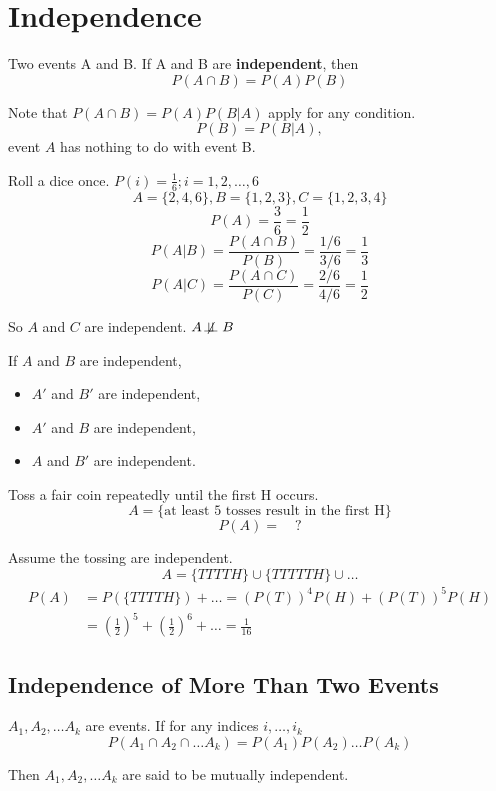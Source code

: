 \section{Independence}
\begin{defn}
Two events A and B. If A and B are \textbf{independent}, then
\[P(A\cap B)=P(A)P(B) \]

Note that $P(A \cap B)=P(A)P(B|A)$ apply for any condition.
\[  P(B)=P(B|A), \]
event $A$ has nothing to do with event B.
\end{defn}

\begin{exmp}
  Roll a dice once. $P(i)=\frac{1}{6}; i=1,2,\dots,6$
  \[  A=\{2,4,6\},   B=\{1,2,3\},   C=\{1,2,3,4\} \]
  \[  P(A)=\frac{3}{6}=\frac{1}{2} \]
  \[ P(A|B)=\frac{P(A\cap B)}{P(B)}=\frac{1/6}{3/6}=\frac{1}{3} \]
  \[ P(A|C)=\frac{P(A\cap C)}{P(C)}=\frac{2/6}{4/6}=\frac{1}{2} \]

So $A$ and $C$ are independent. $A \not\!\perp\!\!\!\perp B$
\end{exmp}

\begin{prop}
If $A$ and $B$ are independent,
\begin{itemize}
  \item $A'$ and $B'$ are independent,
  \item $A'$ and $B$ are independent,
  \item $A$ and $B'$ are independent.
\end{itemize}
\end{prop}

\begin{exmp}
  Toss a fair coin repeatedly until the first H occurs.
  \[A=\{\text{at least 5 tosses result in the first H}\}\]
  \[P(A)= \quad ?\]
\begin{solution}	 
Assume the tossing are independent.
\[A=\{TTTTH\}\cup	\{TTTTTH\} \cup \dots	\]
\begin{align*}
P(A)&=P(\{TTTTH\})+\dots =(P(T))^4 P(H)+(P(T))^5 P(H)\\
&=\left(\frac{1}{2}\right)^5+\left(\frac{1}{2}\right)^6+\dots=\frac{1}{16}
\end{align*}
\end{solution}
\end{exmp}

\subsection{Independence of More Than Two Events}
\begin{defn}
$A_1,A_2,\dots A_k$ are events. If for any indices $i,\dots, i_k$
\[P(A_1 \cap A_2 \cap \dots A_k)=P(A_1)P(A_2)\dots P(A_k)\]

Then $A_1,A_2,\dots A_k$ are said to be mutually independent.
\end{defn}

